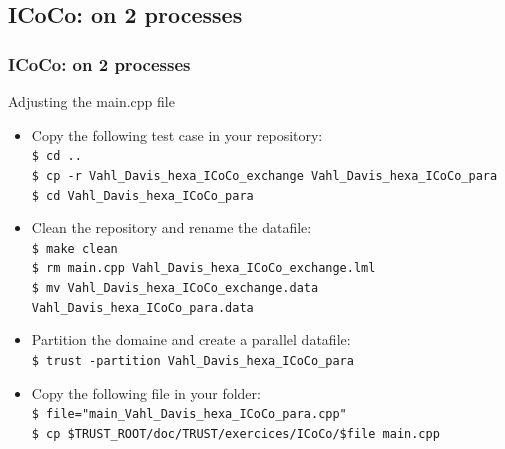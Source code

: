\documentclass[10pt, hyperref={unicode=true,pdfusetitle, bookmarks=true,bookmarksnumbered=false,bookmarksopen=false, breaklinks=false,pdfborder={0 0 1},backref=true,colorlinks=true,linkcolor=darkblue,pageanchor, urlcolor=darkblue}]{beamer}
\begin{document}
\subsection{{\bf{ICoCo: on 2 processes}}}
\begin{frame}
\end{frame}
\begin{frame}
\frametitle{ICoCo: on 2 processes}
\begin{block}{Adjusting the main.cpp file}

\begin{itemize}
\item Copy the following test case in your repository:\\
\texttt{\$ cd ..}\\
\texttt{\$ cp -r Vahl\_Davis\_hexa\_ICoCo\_exchange Vahl\_Davis\_hexa\_ICoCo\_para}\\
\texttt{\$ cd Vahl\_Davis\_hexa\_ICoCo\_para}\\
\item Clean the repository and rename the datafile:\\
\texttt{\$ make clean}\\
\texttt{\$ rm main.cpp Vahl\_Davis\_hexa\_ICoCo\_exchange.lml}\\
\texttt{\$ mv Vahl\_Davis\_hexa\_ICoCo\_exchange.data Vahl\_Davis\_hexa\_ICoCo\_para.data }
\item Partition the domaine and create a parallel datafile: \\
\texttt{\$ trust -partition Vahl\_Davis\_hexa\_ICoCo\_para}\\

\item Copy the following file in your folder:\\
\texttt{\$ file="main\_Vahl\_Davis\_hexa\_ICoCo\_para.cpp"}\\
\texttt{\$ cp \$TRUST\_ROOT/doc/TRUST/exercices/ICoCo/\$file main.cpp}\\
\end{itemize}

\end{block}
\end{frame}
\end{document}
